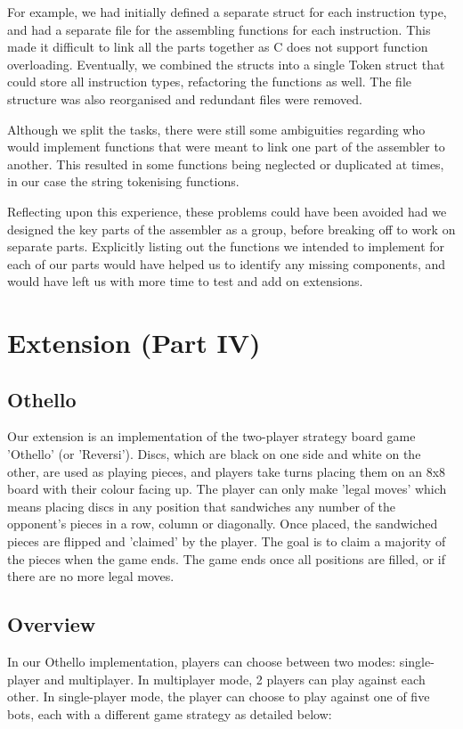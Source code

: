 \documentclass[a4paper,11pt]{article}
\begin{document}
For example, we had initially defined a separate struct for each instruction type, and had a separate file for the assembling functions for each instruction. This made it difficult to link all the parts together as C does not support function overloading. Eventually, we combined the structs into a single Token struct that could store all instruction types, refactoring the functions as well. The file structure was also reorganised and redundant files were removed. \newline

Although we split the tasks, there were still some ambiguities regarding who would implement functions that were meant to link one part of the assembler to another. This resulted in some functions being neglected or duplicated at times, in our case the string tokenising functions.\newline

Reflecting upon this experience, these problems could have been avoided had we designed the key parts of the assembler as a group, before breaking off to work on separate parts. Explicitly listing out the functions we intended to implement for each of our parts would have helped us to identify any missing components, and would have left us with more time to test and add on extensions.

\section{Extension (Part IV)}

\subsection{Othello}
Our extension is an implementation of the two-player strategy board game 'Othello' (or 'Reversi'). Discs, which are black on one side and white on the other, are used as playing pieces, and players take turns placing them on an 8x8 board with their colour facing up. The player can only make 'legal moves' which means placing discs in any position that sandwiches any number of the opponent's pieces in a row, column or diagonally. Once placed, the sandwiched pieces are flipped and 'claimed' by the player. The goal is to claim a majority of the pieces when the game ends. The game ends once all positions are filled, or if there are no more legal moves.

\subsection{Overview}
In our Othello implementation, players can choose between two modes: single-player and multiplayer. In multiplayer mode, 2 players can play against each other. In single-player mode, the player can choose to play against one of five bots, each with a different game strategy as detailed below:
\end{document}
